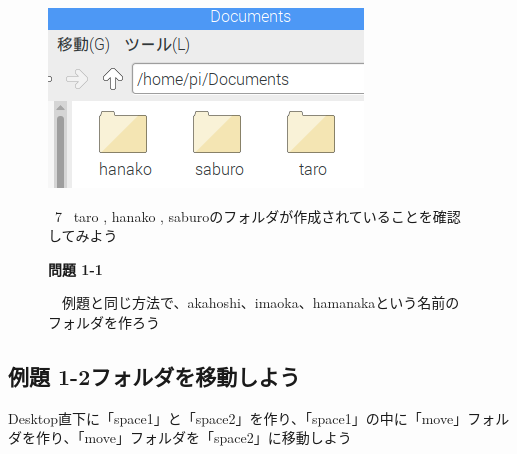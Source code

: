 \documentclass[a4paper,12pt]{jarticle}
\begin{document}
\begin{figure}
\centering
\includegraphics[width=8.359cm,height=4.761cm]{textbook-img043.png}
\begin{minipage}{\textwidth}
\ 7 \ taro , hanako ,
saburoのフォルダが作成されていることを確認してみよう
\end{minipage}
	\vspace{10mm}
\flushleft
{\bfseries
問題 1-1}

　例題と同じ方法で、akahoshi、imaoka、hamanakaという名前のフォルダを作ろう

\end{figure}
\clearpage\subsection{例題 1-2フォルダを移動しよう}
Desktop直下に「space1」と「space2」を作り、「space1」の中に「move」フォルダを作り、「move」フォルダを「space2」に移動しよう

\end{document}
